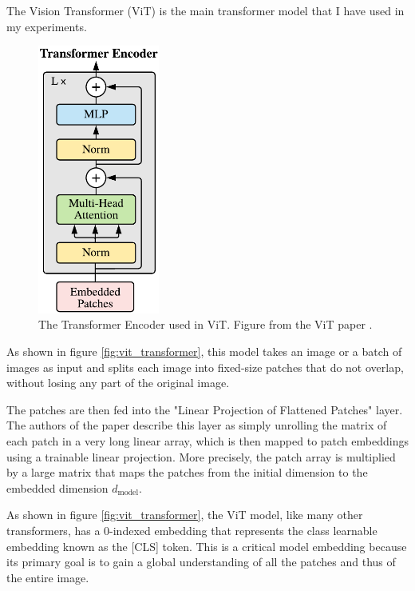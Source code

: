 \documentclass{report}[12pt, a4paper]
\begin{document}
The Vision Transformer (ViT) \cite{vit_paper} is the main transformer model that I have used in my experiments.

\begin{figure}[htp]
    \centering
    \includegraphics[width=4cm]{vit_encoder}
    \caption{The Transformer Encoder used in ViT. Figure from the ViT paper \cite{vit_paper}.}
    \label{fig:vit_encoder}
\end{figure}

As shown in figure \ref{fig:vit_transformer}, this model takes an image or a batch of images as input and splits each image into fixed-size patches that do not overlap, without losing any part of the original image. 


The patches are then fed into the "Linear Projection of Flattened Patches" layer. The authors of the paper describe this layer as simply unrolling the matrix of each patch in a very long linear array, which is then mapped to patch embeddings using a trainable linear projection. More precisely, the patch array is multiplied by a large matrix that maps the patches from the initial dimension to the embedded dimension $d_{\text{model}}$.

As shown in figure \ref{fig:vit_transformer}, the ViT model, like many other transformers, has a 0-indexed embedding that represents the class learnable embedding known as the [CLS] token. This is a critical model embedding because its primary goal is to gain a global understanding of all the patches and thus of the entire image.
\end{document}
